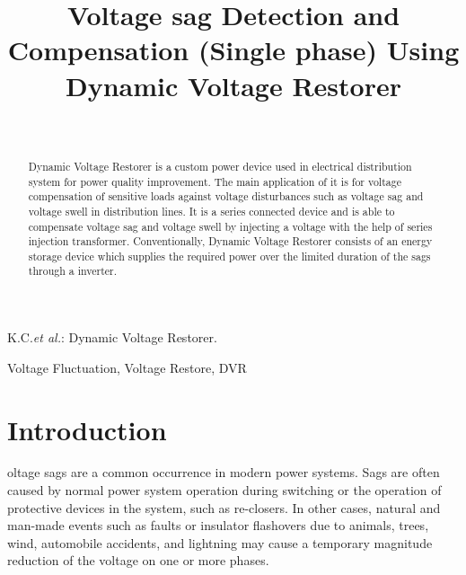 \documentclass[journal,twoside]{IEEEtran}
\begin{document}
    \setcounter{page}{37}
    \title{Voltage sag Detection and Compensation (Single phase) Using Dynamic Voltage Restorer}
    \author{\\
    }

%
{K.C.\MakeLowercase{\textit{et al.}}: Dynamic Voltage Restorer.}
    \maketitle
	\begin{abstract}
Dynamic Voltage Restorer is a custom
power device used in electrical distribution system for
power quality improvement. The main application of it
is for voltage compensation of sensitive loads against
voltage disturbances such as voltage sag and voltage swell
in distribution lines. It is a series connected device and is
able to compensate voltage sag and voltage swell by
injecting a voltage with the help of series injection
transformer. Conventionally, Dynamic Voltage Restorer consists of an energy
storage device which supplies the required power over the
limited duration of the sags through a inverter.
	\end{abstract}
	\begin{IEEEkeywords}
Voltage Fluctuation, Voltage Restore, DVR
	\end{IEEEkeywords}
	\section{Introduction}
oltage sags are a common occurrence in modern power systems. Sags are often caused by normal power system operation during switching or the operation of protective devices in the system, such as re-closers. In other cases, natural and man-made events such as faults or insulator
flashovers due to animals, trees, wind, automobile accidents, and lightning may cause a temporary magnitude reduction of the voltage on one or more phases.
\end{document}
